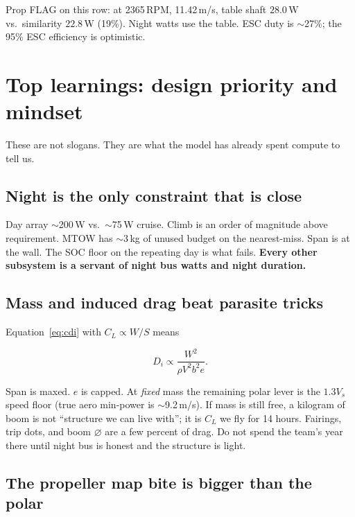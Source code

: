 \documentclass[11pt,letterpaper]{article}
\begin{document}
Prop FLAG on this row: at 2365\,RPM, 11.42\,m/s, table shaft $28.0\,\mathrm{W}$ vs.\ similarity $22.8\,\mathrm{W}$ (19\%). Night watts use the table. ESC duty is $\sim$27\%; the 95\% ESC efficiency is optimistic.

\section{Top learnings: design priority and mindset}

These are not slogans. They are what the model has already spent compute to tell us.

\subsection{Night is the only constraint that is close}

Day array $\sim$200\,W vs.\ $\sim$75\,W cruise. Climb is an order of magnitude above requirement. MTOW has $\sim$3\,kg of unused budget on the nearest-miss. Span is at the wall. The SOC floor on the repeating day is what fails. \textbf{Every other subsystem is a servant of night bus watts and night duration.}

\subsection{Mass and induced drag beat parasite tricks}

Equation~\eqref{eq:cdi} with $C_L \propto W/S$ means

\begin{equation}
  D_i \propto \frac{W^2}{\rho V^2 b^2 e}.
\end{equation}

Span is maxed. $e$ is capped. At \emph{fixed} mass the remaining polar lever is the $1.3 V_s$ speed floor (true aero min-power is $\sim$9.2\,m/s). If mass is still free, a kilogram of boom is not ``structure we can live with''; it is $C_L$ we fly for 14 hours. Fairings, trip dots, and boom $\varnothing$ are a few percent of drag. Do not spend the team's year there until night bus is honest and the structure is light.

\subsection{The propeller map bite is bigger than the polar}
\end{document}

